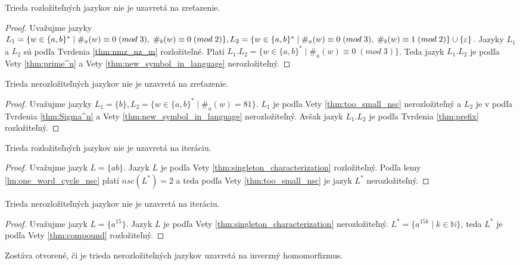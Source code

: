 \begin{proposition}
Trieda rozložiteľných jazykov nie je uzavretá na zreťazenie.
\end{proposition}

\begin{proof}
Uvažujme jazyky $ L_1 = \lbrace w \in \lbrace a,b \rbrace^* \; | \; \#_a(w) \equiv 0 \;  (mod \; 3), \; \#_b(w) \equiv 0 \; (mod \; 2) \rbrace, \\ L_2 = \lbrace w \in \lbrace a,b \rbrace^* \; | \; \#_a(w) \equiv 0 \; (mod \; 3), \; \#_b(w) \equiv 1 \; (mod \; 2) \rbrace \cup \lbrace \varepsilon \rbrace $. Jazyky $ L_1 $ a $ L_2 $ sú podľa Tvrdenia \ref{thm:nmz_nz_m} rozložiteľné. Platí $ L_1.L_2 = \lbrace w \in \lbrace a,b \rbrace^* \; | \; \#_a(w) \equiv 0 \; (mod \; 3) \rbrace $. Teda jazyk $ L_1.L_2 $ je podľa Vety \ref{thm:prime^n} a Vety \ref{thm:new_symbol_in_language} nerozložiteľný.
\end{proof}

\begin{proposition}
Trieda nerozložiteľných jazykov nie je uzavretá na zreťazenie.
\end{proposition}

\begin{proof}
Uvažujme jazyky $ L_1 = \lbrace b \rbrace, L_2 = \lbrace w \in \lbrace a,b \rbrace^* \; | \; \#_a(w) = 81 \rbrace $. $ L_1 $ je podľa Vety \ref{thm:too_small_nsc} nerozložiteľný a $ L_2 $ je v podľa Tvrdenia \ref{thm:Sigma^n} a Vety \ref{thm:new_symbol_in_language} nerozložiteľný. Avšak jazyk $ L_1.L_2 $ je podľa Tvrdenia \ref{thm:prefix} rozložiteľný.
\end{proof}

\begin{proposition}
Trieda rozložiteľných jazykov nie je uzavretá na iteráciu.
\end{proposition}

\begin{proof}
Uvažujme jazyk $ L = \lbrace ab \rbrace $. Jazyk $ L $ je podľa Vety \ref{thm:singleton_characterization} rozložiteľný. Podľa lemy \ref{lm:one_word_cycle_nsc} platí $ nsc(L^*)=2 $ a teda podľa Vety \ref{thm:too_small_nsc} je jazyk $ L^* $ nerozložiteľný.
\end{proof}

\begin{proposition}
Trieda nerozložiteľných jazykov nie je uzavretá na iteráciu.
\end{proposition}

\begin{proof}
Uvažujme jazyk $ L = \lbrace a^{15} \rbrace $. Jazyk $ L $ je podľa Vety \ref{thm:singleton_characterization} nerozložiteľný. $ L^* = \lbrace a^{15k} \; | \; k \in \mathbb{N} \rbrace $, teda $ L^* $ je podľa Vety \ref{thm:compound} rozložiteľný.
\end{proof}

Zostáva otvorené, či je trieda nerozložiteľných jazykov uzavretá na inverzný homomorfizmus.












